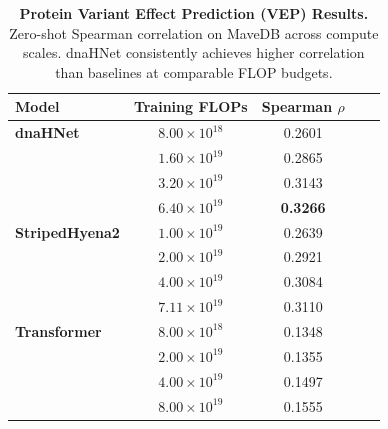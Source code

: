 \documentclass{article}
\theoremstyle{plain}
\theoremstyle{definition}
\theoremstyle{remark}
\begin{document}
\begin{table}[h]
\centering
\caption{\textbf{Protein Variant Effect Prediction (VEP) Results.} Zero-shot Spearman correlation on MaveDB across compute scales. dnaHNet consistently achieves higher correlation than baselines at comparable FLOP budgets.}
\label{tab:vep_results}
\begin{small}
\begin{tabular}{lcccc}
\toprule
\textbf{Model} & \textbf{Training FLOPs} & \textbf{Spearman $\rho$} \\
\midrule
\textbf{dnaHNet} & $8.00 \times 10^{18}$ & 0.2601 \\
                 & $1.60 \times 10^{19}$ & 0.2865 \\
                 & $3.20 \times 10^{19}$ & 0.3143 \\
                 & $6.40 \times 10^{19}$ & \textbf{0.3266} \\
\midrule
\textbf{StripedHyena2} & $1.00 \times 10^{19}$ & 0.2639 \\
                       & $2.00 \times 10^{19}$ & 0.2921 \\
                       & $4.00 \times 10^{19}$ & 0.3084 \\
                       & $7.11 \times 10^{19}$ & 0.3110 \\
\midrule
\textbf{Transformer} & $8.00 \times 10^{18}$ & 0.1348 \\
                     & $2.00 \times 10^{19}$ & 0.1355 \\
                     & $4.00 \times 10^{19}$ & 0.1497 \\
                     & $8.00 \times 10^{19}$ & 0.1555 \\
\bottomrule
\end{tabular}
\end{small}
\end{table}
\end{document}
